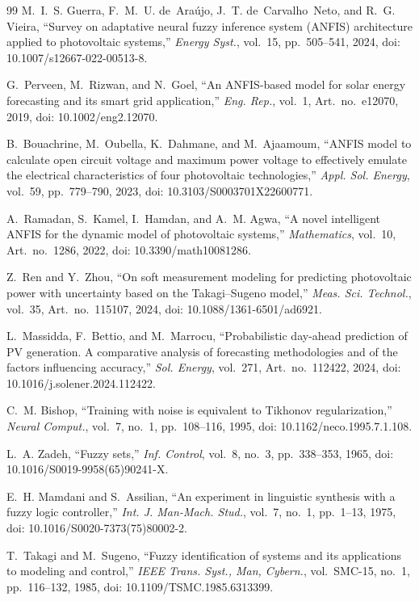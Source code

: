 \documentclass[11pt,a4paper]{article}
\begin{document}
\begin{thebibliography}{99}
M.~I.~S. Guerra, F.~M.~U. de~Araújo, J.~T. de~Carvalho~Neto, and R.~G. Vieira, ``Survey on adaptative neural fuzzy inference system (ANFIS) architecture applied to photovoltaic systems,'' \emph{Energy Syst.}, vol.~15, pp.~505--541, 2024, doi: 10.1007/s12667-022-00513-8.

G.~Perveen, M.~Rizwan, and N.~Goel, ``An ANFIS-based model for solar energy forecasting and its smart grid application,'' \emph{Eng. Rep.}, vol.~1, Art.~no.~e12070, 2019, doi: 10.1002/eng2.12070.

B.~Bouachrine, M.~Oubella, K.~Dahmane, and M.~Ajaamoum, ``ANFIS model to calculate open circuit voltage and maximum power voltage to effectively emulate the electrical characteristics of four photovoltaic technologies,'' \emph{Appl. Sol. Energy}, vol.~59, pp.~779--790, 2023, doi: 10.3103/S0003701X22600771.

A.~Ramadan, S.~Kamel, I.~Hamdan, and A.~M. Agwa, ``A novel intelligent ANFIS for the dynamic model of photovoltaic systems,'' \emph{Mathematics}, vol.~10, Art.~no.~1286, 2022, doi: 10.3390/math10081286.

Z.~Ren and Y.~Zhou, ``On soft measurement modeling for predicting photovoltaic power with uncertainty based on the Takagi–Sugeno model,'' \emph{Meas. Sci. Technol.}, vol.~35, Art.~no.~115107, 2024, doi: 10.1088/1361-6501/ad6921.

L.~Massidda, F.~Bettio, and M.~Marrocu, ``Probabilistic day-ahead prediction of PV generation. A comparative analysis of forecasting methodologies and of the factors influencing accuracy,'' \emph{Sol. Energy}, vol.~271, Art.~no.~112422, 2024, doi: 10.1016/j.solener.2024.112422.

C.~M. Bishop, ``Training with noise is equivalent to Tikhonov regularization,'' \emph{Neural Comput.}, vol.~7, no.~1, pp.~108--116, 1995, doi: 10.1162/neco.1995.7.1.108.

L.~A. Zadeh, ``Fuzzy sets,'' \emph{Inf. Control}, vol.~8, no.~3, pp.~338--353, 1965, doi: 10.1016/S0019-9958(65)90241-X.

E.~H. Mamdani and S.~Assilian, ``An experiment in linguistic synthesis with a fuzzy logic controller,'' \emph{Int. J. Man-Mach. Stud.}, vol.~7, no.~1, pp.~1--13, 1975, doi: 10.1016/S0020-7373(75)80002-2.

T.~Takagi and M.~Sugeno, ``Fuzzy identification of systems and its applications to modeling and control,'' \emph{IEEE Trans. Syst., Man, Cybern.}, vol.~SMC-15, no.~1, pp.~116--132, 1985, doi: 10.1109/TSMC.1985.6313399.


\end{thebibliography}
\end{document}
